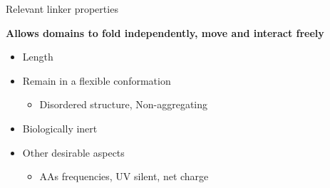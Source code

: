 \documentclass{beamer}
\begin{document}

% 










\begin{frame}{Relevant linker properties}
\vspace{-20px}
\begin{adjustwidth}{-0.5em}{-1.5em}
\textbf{Allows domains to fold independently, move and interact freely}
 \end{adjustwidth}

 \vspace{10px}

\begin{itemize}
  \item Length
  \item Remain in a flexible conformation  %
    \begin{itemize}
     \item Disordered structure, Non-aggregating
    \end{itemize}

  \item Biologically inert  %
  \item Other desirable aspects  %
    \begin{itemize}
     \item AAs frequencies, UV silent, net charge
    \end{itemize}
\end{itemize}


\end{frame}
\end{document}
